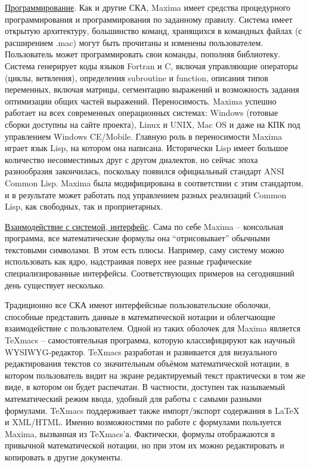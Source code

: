 \underline{Программирование}. Как и другие СКА, Maxima имеет средства процедурного программирования и программирования по заданному правилу. Система имеет открытую архитектуру, большинство команд, хранящихся в командных файлах (с расширением .mac) могут быть прочитаны и изменены пользователем. Пользователь может программировать свои команды, пополняя библиотеку. Система генерирует коды языков Fortran и C, включая управляющие операторы (циклы, ветвления), определения subroutine и function, описания типов переменных, включая матрицы, сегментацию выражений и возможность задания оптимизации общих частей выражений.
Переносимость. Maxima успешно работает на всех современных операционных системах: Windows (готовые сборки доступны на сайте проекта), Linux и UNIX, Mac OS и даже на КПК под управлением Windows CE/Mobile. Главную роль в переносимости Maxima играет язык Lisp, на котором она написана. Исторически Lisp имеет большое количество несовместимых друг с другом диалектов, но сейчас эпоха разнообразия закончилась, поскольку появился официальный стандарт ANSI Common Lisp. Maxima была модифицирована в соответствии с этим стандартом, и в результате может работать под управлением разных реализаций Common Lisp, как свободных, так и проприетарных.

\underline{Взаимодействие с системой, интерфейс}. Сама по себе Maxima -- консольная программа, все математические формулы она “отрисовывает” обычными текстовыми символами. В этом есть плюсы. Например, саму систему можно использовать как ядро, надстраивая поверх нее разные графические специализированные интерфейсы. Соответствующих примеров на сегодняшний день существует несколько.

Традиционно все СКА имеют интерфейсные пользовательские оболочки, способные представить данные в математической нотации и облегчающие взаимодействие с пользователем. Одной из таких оболочек для Maxima является TeXmacs -- самостоятельная программа, которую классифицируют как научный WYSIWYG-редактор. TeXmacs разработан и развивается для визуального редактирования текстов со значительным объёмом математической нотации, в котором пользователь видит на экране редактируемый текст практически в том же виде, в котором он будет распечатан. В частности, доступен так называемый математический режим ввода, удобный для работы с самыми разными формулами. TeXmacs поддерживает также импорт/экспорт содержания в LaTeX и XML/HTML. Именно возможностями по работе с формулами пользуется Maxima, вызванная из TeXmacs’а. Фактически, формулы отображаются в привычной математической нотации, но при этом их можно редактировать и копировать в другие документы.

